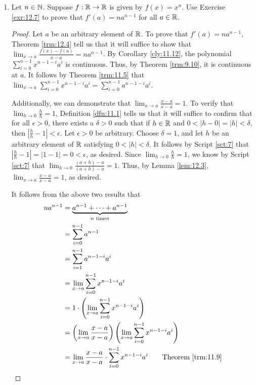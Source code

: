 \documentclass[../main.tex]{subfiles}
\begin{document}
\begin{exercise}\label{exr:12.8}\leavevmode
    \begin{enumerate}[label={(\alph*)}]
        \item Let $n\in\mathbb{N}$. Suppose $f:\mathbb{R}\to\mathbb{R}$ is given by $f(x)=x^n$. Use Exercise \ref{exr:12.7} to prove that $f'(a)=na^{n-1}$ for all $a\in\mathbb{R}$.
        \begin{proof}
            Let $a$ be an arbitrary element of $\mathbb{R}$. To prove that $f'(a)=na^{n-1}$, Theorem \ref{trm:12.4} tell us that it will suffice to show that $\lim_{x\to a}\frac{f(x)-f(a)}{x-a}=na^{n-1}$. By Corollary \ref{cly:11.12}, the polynomial $\sum_{i=0}^{n-1}x^{n-1-i}a^i$ is continuous. Thus, by Theorem \ref{trm:9.10}, it is continuous at $a$. It follows by Theorem \ref{trm:11.5} that $\lim_{x\to a}\sum_{i=0}^{n-1}x^{n-1-i}a^i=\sum_{i=0}^{n-1}a^{n-1-i}a^i$.\par
            Additionally, we can demonstrate that $\lim_{x\to a}\frac{x-a}{x-a}=1$. To verify that $\lim_{h\to 0}\frac{h}{h}=1$, Definition \ref{dfn:11.1} tells us that it will suffice to confirm that for all $\epsilon>0$, there exists a $\delta>0$ such that if $h\in\mathbb{R}$ and $0<|h-0|=|h|<\delta$, then $|\frac{h}{h}-1|<\epsilon$. Let $\epsilon>0$ be arbitrary. Choose $\delta=1$, and let $h$ be an arbitrary element of $\mathbb{R}$ satisfying $0<|h|<\delta$. It follows by Script \ref{sct:7} that $|\frac{h}{h}-1|=|1-1|=0<\epsilon$, as desired. Since $\lim_{h\to 0}\frac{h}{h}=1$, we know by Script \ref{sct:7} that $\lim_{h\to 0}\frac{(a+h)-a}{(a+h)-a}=1$. Thus, by Lemma \ref{lem:12.3}, $\lim_{x\to a}\frac{x-a}{x-a}=1$, as desired.\par
            It follows from the above two results that
            \begin{align*}
                na^{n-1} &= \underbrace{a^{n-1}+\cdots+a^{n-1}}_{n\text{ times}}\\
                &= \sum_{i=0}^{n-1}a^{n-1}\\
                &= \sum_{i=1}^{n-1}a^{n-1-i}a^i\\
                &= \lim_{x\to a}\sum_{i=0}^{n-1}x^{n-1-i}a^i\\
                &= 1\cdot\left( \lim_{x\to a}\sum_{i=0}^{n-1}x^{n-1-i}a^i \right)\\
                &= \left( \lim_{x\to a}\frac{x-a}{x-a} \right)\left( \lim_{x\to a}\sum_{i=0}^{n-1}x^{n-1-i}a^i \right)\\
                &= \lim_{x\to a}\frac{x-a}{x-a}\cdot\sum_{i=0}^{n-1}x^{n-1-i}a^i\tag*{Theorem \ref{trm:11.9}}\\

\end{align*}
\end{proof}
\end{enumerate}
\end{exercise}
\end{document}
